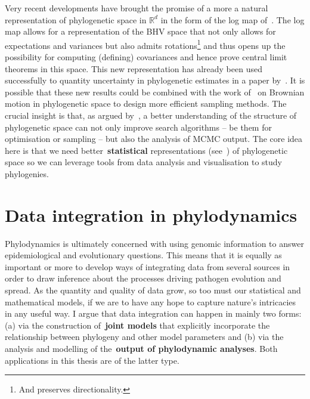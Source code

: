 Very recent developments have brought the promise of a more a natural representation of phylogenetic space in $\mathbb{R}^d$ in the form of the log map of~\cite{Barden2018}.
The log map allows for a representation of the BHV space that not only allows for expectations and variances but also admits rotations\footnote{And preserves directionality.} and thus opens up the possibility for computing (defining) covariances and hence prove central limit theorems in this space.
This new representation has already been used successfully to quantity uncertainty in phylogenetic estimates in a paper by~\cite{Willis2017}.
It is possible that these new results could be combined with the work of~\cite{Nye2015} on Brownian motion in phylogenetic space to design more efficient sampling methods.
The crucial insight is that, as argued by~\cite{StJohn2017}, a better understanding of the structure of phylogenetic space can not only improve search  algorithms -- be them for optimisation or sampling -- but also the analysis of MCMC output.
The core idea here is that we need better~\textbf{statistical} representations (see~\cite{Holland2013}) of phylogenetic space so we can leverage tools from data analysis and visualisation to study phylogenies.

\section{Data integration in phylodynamics}

Phylodynamics is ultimately concerned with using genomic information to answer epidemiological and evolutionary questions.
This means that it is equally as important or more to develop ways of integrating data from several sources in order to draw inference about the processes driving pathogen evolution and spread.
As the quantity and quality of data grow, so too must our statistical and mathematical models, if we are to have any hope to capture nature's intricacies in any useful way.
I argue that data integration can happen in mainly two forms: (a) via the construction of~\textbf{joint models} that explicitly incorporate the relationship between phylogeny and other model parameters and (b) via the analysis and modelling of the~\textbf{output of phylodynamic analyses}.
Both applications in this thesis are of the latter type.

